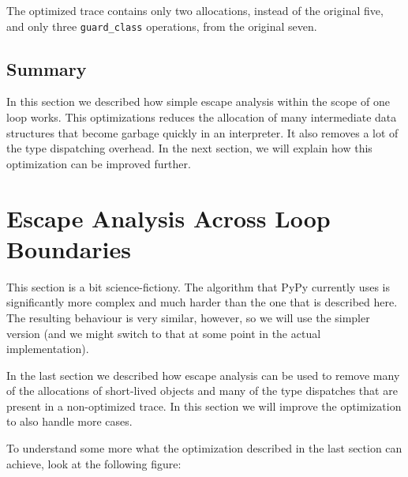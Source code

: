 \documentclass{sigplanconf}
\begin{document}
The optimized trace contains only two allocations, instead of the original five,
and only three \texttt{guard\_class} operations, from the original seven.



\subsection{Summary}

In this section we described how simple escape analysis within the scope of one
loop works. This optimizations reduces the allocation of many intermediate data
structures that become garbage quickly in an interpreter. It also removes a lot
of the type dispatching overhead. In the next section, we will explain how this
optimization can be improved further.


\section{Escape Analysis Across Loop Boundaries}
\label{sec:crossloop}

This section is a bit
science-fictiony. The algorithm that PyPy currently uses is significantly more
complex and much harder than the one that is described here. The resulting
behaviour is very similar, however, so we will use the simpler version (and we
might switch to that at some point in the actual implementation).

In the last section we described how escape analysis can be used to remove
many of the allocations of short-lived objects and many of the type dispatches
that are present in a non-optimized trace. In this section we will improve the
optimization to also handle more cases.

To understand some more what the optimization described in the last section
can achieve, look at the following figure:
\end{document}
